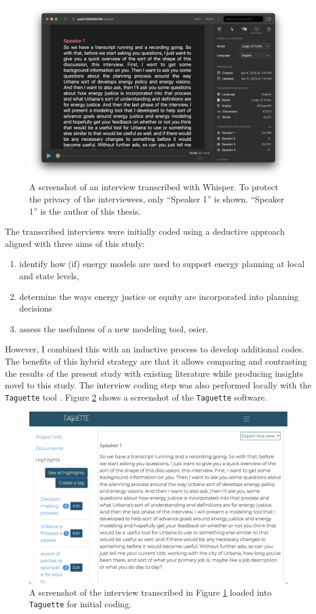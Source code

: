 \begin{figure}[htbp!]
    \centering
    \includegraphics[width=0.75\columnwidth]{figures/07_interview_chapter/whisper-screenshot.png}
    \caption{A screenshot of an interview transcribed with Whisper. To protect
    the privacy of the interviewees, only ``Speaker 1'' is shown. ``Speaker 1''
    is the author of this thesis.}
    \label{fig:whisper}
\end{figure}

The transcribed interviews were initially coded using a deductive approach
aligned with three aims of this study:
\begin{enumerate}
    \item identify how (if) energy models are used to support energy planning at
    local and state levels,
    \item determine the ways energy justice or equity are incorporated into
    planning decisions
    \item assess the usefulness of a new modeling tool, \ac{osier}.
\end{enumerate} 
However, I combined this with an inductive process to develop additional codes.
The benefits of this hybrid strategy are that it allows comparing and
contrasting the results of the present study with existing literature while
producing insights novel to this study. The interview coding step was also
performed locally with the \texttt{Taguette} tool \cite{rampin_taguette_2021}.
Figure \ref{fig:taguette} shows a screenshot of the \texttt{Taguette} software.

\begin{figure}[htbp!]
    \centering
    \includegraphics[width=0.75\columnwidth]{figures/07_interview_chapter/taguette-screenshot}
    \caption{A screenshot of the interview transcribed in Figure \ref{fig:whisper}
    loaded into \texttt{Taguette} for initial coding.}
    \label{fig:taguette}
\end{figure}

